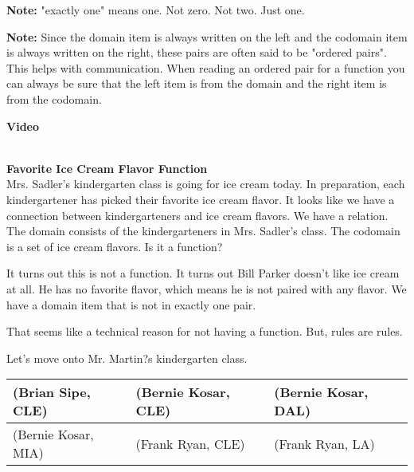 \documentclass{ximera}
\begin{document}
\begin{observation} 
\textbf{Note:} "exactly one" means one. Not zero. Not two. Just one.
\end{observation}

\begin{observation} 
\textbf{Note:} Since the domain item is always written on the left and the codomain item is always written on the right, these pairs are often said to be "ordered pairs". This helps with communication. When reading an ordered pair for a function you can always be sure that the left item is from the domain and the right item is from the codomain.
\end{observation}


\begin{explanation} \textbf{Video}
\begin{center}
\end{center}
\end{explanation}

\quad \\


\textbf{Favorite Ice Cream Flavor Function} \\

Mrs. Sadler's kindergarten class is going for ice cream today.  In preparation, each kindergartener has picked their favorite ice cream flavor. It looks like we have a connection between kindergarteners and ice cream flavors.  We have a relation.  The domain consists of the kindergarteners in Mrs. Sadler's class.  The codomain is a set of ice cream flavors. Is it a function?

It turns out this is not a function.  It turns out Bill Parker doesn't like ice cream at all. He has no favorite flavor, which means he is not paired with any flavor.  We have a domain item that is not in exactly one pair.

That seems like a technical reason for not having a function.  But, rules are rules.  

Let's move onto Mr. Martin?s kindergarten class.

\begin{center}

\begin{tabular}{|l|l|l|}
\hline
(Brian Sipe, CLE) &  (Bernie Kosar, CLE) & (Bernie Kosar, DAL) \\\hline 
(Bernie Kosar, MIA) & (Frank Ryan, CLE) & (Frank Ryan, LA) \\\hline 
\end{tabular}

\end{center}
\end{document}
